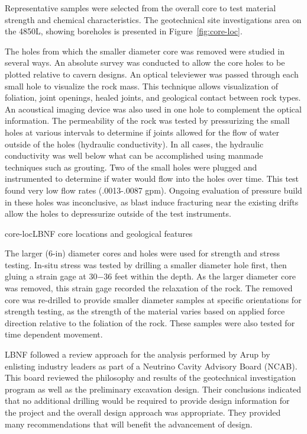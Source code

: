 Representative samples were selected from the overall core to test material strength and chemical characteristics. The geotechnical site investigations area on the 4850L, showing boreholes is presented in Figure~\ref{fig:core-loc}. 

The holes from which the smaller diameter core was removed were studied in several ways.  An absolute survey was conducted to allow the core holes to be plotted relative to cavern designs.  An optical televiewer was passed through each small hole to visualize the rock mass.  This technique allows visualization of foliation, joint openings, healed joints, and geological contact between rock types.  An acoustical imaging device was also used in one hole to complement the optical information.  The permeability of the rock was tested by pressurizing the small holes at various intervals to determine if joints allowed for the flow of water outside of the holes (hydraulic conductivity).  In all cases, the hydraulic conductivity was well below what can be accomplished using manmade techniques such as grouting.   Two of the small holes were plugged and instrumented to determine if water would flow into the holes over time.  This test found very low flow rates (.0013-.0087 gpm).  Ongoing evaluation of pressure build in these holes was inconclusive, as blast induce fracturing near the existing drifts allow the holes to depressurize outside of the test instruments.

\begin{cdrfigure}{core-loc}{LBNF core locations and geological features}
\end{cdrfigure}

The larger (6-in) diameter cores and holes were used for strength and stress testing.  In-situ stress was tested by drilling a smaller diameter hole first, then gluing a strain gage at 30$-$36 feet within the depth.  As the larger diameter core was removed, this strain gage recorded the relaxation of the rock.  The removed core was re-drilled to provide smaller diameter samples at specific orientations for strength testing, as the strength of the material varies based on applied force direction relative to the foliation of the rock.  These samples were also tested for time dependent movement. 

LBNF followed a review approach for the analysis performed by Arup by enlisting industry leaders as part of a Neutrino Cavity Advisory Board (NCAB).  This board reviewed the philosophy and results of the geotechnical investigation program as well as the preliminary excavation design.  Their conclusions indicated that no additional drilling would be required to provide design information for the project and the overall design approach was appropriate.  They provided many recommendations that will benefit the advancement of design.

